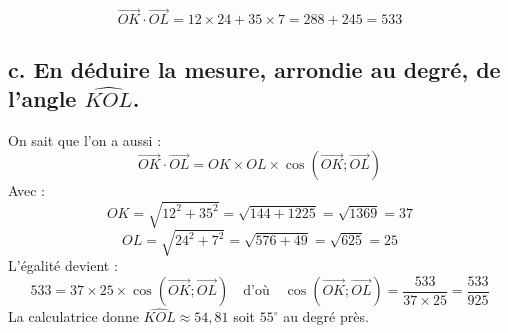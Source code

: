 	\[
	\overrightarrow{OK} \cdot \overrightarrow{OL} = 12 \times 24 + 35 \times 7 = 288 + 245 = 533
	\]
	
	\subsection*{c. En déduire la mesure, arrondie au degré, de l’angle $\widehat{KOL}$.}
On sait que l’on a aussi :
	\[
	\overrightarrow{OK} \cdot \overrightarrow{OL} = OK \times OL \times \cos(\overrightarrow{OK}; \overrightarrow{OL})
	\]
Avec :
	\[
	OK = \sqrt{12^2 + 35^2} = \sqrt{144 + 1225} = \sqrt{1369} = 37
	\]
	\[
	OL = \sqrt{24^2 + 7^2} = \sqrt{576 + 49} = \sqrt{625} = 25
	\]
L’égalité devient :
	\[
	533 = 37 \times 25 \times \cos(\overrightarrow{OK}; \overrightarrow{OL}) \quad \text{d’où} \quad \cos(\overrightarrow{OK}; \overrightarrow{OL}) = \dfrac{533}{37 \times 25} = \dfrac{533}{925}
	\]
La calculatrice donne $\widehat{KOL} \approx 54,81$ soit $55^\circ$ au degré près.
